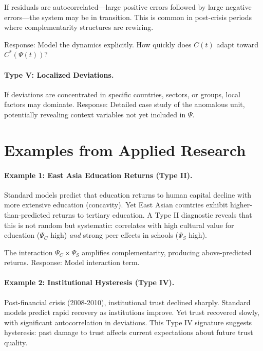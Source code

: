 \documentclass[12pt,oneside]{book}
\begin{document}
If residuals are autocorrelated—large positive errors followed by large negative errors—the system
may be in transition. This is common in post-crisis periods where complementarity structures are
rewiring.

Response: Model the dynamics explicitly. How quickly does $C(t)$ adapt toward $C^*(\Psi(t))$?

\paragraph{Type V: Localized Deviations.}

If deviations are concentrated in specific countries, sectors, or groups, local factors may dominate.
Response: Detailed case study of the anomalous unit, potentially revealing context variables
not yet included in $\Psi$.

\section{Examples from Applied Research}

\paragraph{Example 1: East Asia Education Returns (Type II).}

Standard models predict that education returns to human capital decline with more extensive education
(concavity). Yet East Asian countries exhibit higher-than-predicted returns to tertiary education.
A Type II diagnostic reveals that this is not random but systematic: correlates with high cultural
value for education ($\Psi_C$ high) \emph{and} strong peer effects in schools ($\Psi_S$ high).

The interaction $\Psi_C \times \Psi_S$ amplifies complementarity, producing above-predicted returns.
Response: Model interaction term.

\paragraph{Example 2: Institutional Hysteresis (Type IV).}

Post-financial crisis (2008-2010), institutional trust declined sharply. Standard models predict
rapid recovery as institutions improve. Yet trust recovered slowly, with significant autocorrelation
in deviations. This Type IV signature suggests hysteresis: past damage to trust affects current
expectations about future trust quality.
\end{document}
